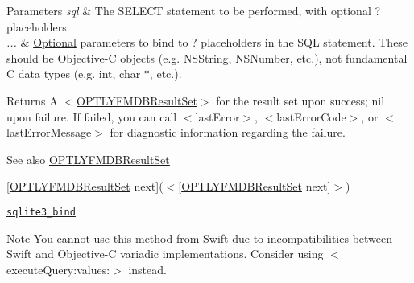 \begin{DoxyParams}{Parameters}
{\em sql} & The S\+E\+L\+E\+CT statement to be performed, with optional {\ttfamily ?} placeholders.\\
\hline
{\em ...} & \mbox{\hyperlink{protocol_optional-p}{Optional}} parameters to bind to {\ttfamily ?} placeholders in the S\+QL statement. These should be Objective-\/C objects (e.\+g. {\ttfamily N\+S\+String}, {\ttfamily N\+S\+Number}, etc.), not fundamental C data types (e.\+g. {\ttfamily int}, {\ttfamily char $\ast$}, etc.).\\
\hline
\end{DoxyParams}
\begin{DoxyReturn}{Returns}
A {\ttfamily $<$\mbox{\hyperlink{interface_o_p_t_l_y_f_m_d_b_result_set}{O\+P\+T\+L\+Y\+F\+M\+D\+B\+Result\+Set}}$>$} for the result set upon success; {\ttfamily nil} upon failure. If failed, you can call {\ttfamily $<$last\+Error$>$}, {\ttfamily $<$last\+Error\+Code$>$}, or {\ttfamily $<$last\+Error\+Message$>$} for diagnostic information regarding the failure.
\end{DoxyReturn}
\begin{DoxySeeAlso}{See also}
\mbox{\hyperlink{interface_o_p_t_l_y_f_m_d_b_result_set}{O\+P\+T\+L\+Y\+F\+M\+D\+B\+Result\+Set}} 

\mbox{[}{\ttfamily \mbox{\hyperlink{interface_o_p_t_l_y_f_m_d_b_result_set}{O\+P\+T\+L\+Y\+F\+M\+D\+B\+Result\+Set}} next}\mbox{]}($<$\mbox{[}\mbox{\hyperlink{interface_o_p_t_l_y_f_m_d_b_result_set}{O\+P\+T\+L\+Y\+F\+M\+D\+B\+Result\+Set}} next\mbox{]}$>$) 

\href{http://sqlite.org/c3ref/bind_blob.html}{\tt {\ttfamily sqlite3\+\_\+bind}}
\end{DoxySeeAlso}
\begin{DoxyNote}{Note}
You cannot use this method from Swift due to incompatibilities between Swift and Objective-\/C variadic implementations. Consider using {\ttfamily $<$execute\+Query\+:values\+:$>$} instead. 
\end{DoxyNote}
\mbox{\label{interface_o_p_t_l_y_f_m_d_b_database_a6e88b56561812ad35813f9053a85cad2}} 
